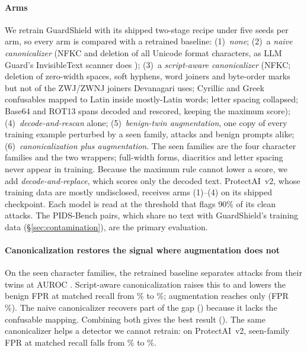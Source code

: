 \documentclass[conference]{IEEEtran}
\begin{document}
\paragraph{Arms} We retrain GuardShield with its shipped two-stage recipe under five seeds per arm, so every arm is compared with a retrained baseline: (1)~\emph{none}; (2)~a \emph{naive canonicalizer} (NFKC and deletion of all Unicode format characters, as LLM Guard's InvisibleText scanner does \citep{llmguard_invisible}); (3)~a \emph{script-aware canonicalizer} (NFKC; deletion of zero-width spaces, soft hyphens, word joiners and byte-order marks but not of the ZWJ/ZWNJ joiners Devanagari uses; Cyrillic and Greek confusables mapped to Latin inside mostly-Latin words; letter spacing collapsed; Base64 and ROT13 spans decoded and rescored, keeping the maximum score); (4)~\emph{decode-and-rescan} alone; (5)~\emph{benign-twin augmentation}, one copy of every training example perturbed by a seen family, attacks and benign prompts alike; (6)~\emph{canonicalization plus augmentation}. The seen families are the four character families and the two wrappers; full-width forms, diacritics and letter spacing never appear in training. Because the maximum rule cannot lower a score, we add \emph{decode-and-replace}, which scores only the decoded text. ProtectAI~v2, whose training data are mostly undisclosed, receives arms (1)--(4) on its shipped checkpoint. Each model is read at the threshold that flags 90\% of its clean attacks. The PIDS-Bench pairs, which share no text with GuardShield's training data (\S\ref{sec:contamination}), are the primary evaluation.


\paragraph{Canonicalization restores the signal where augmentation does not} On the seen character families, the retrained baseline separates attacks from their twins at AUROC \scPidsNoneSeenCharAuc{}. Script-aware canonicalization raises this to \scPidsScriptAwareSeenCharAuc{} and lowers the benign FPR at matched recall from \scPidsNoneSeenCharFpr\% to \scPidsScriptAwareSeenCharFpr\%; augmentation reaches only \scPidsAugmentSeenCharAuc{} (FPR \scPidsAugmentSeenCharFpr\%). The naive canonicalizer recovers part of the gap (\scPidsNaiveSeenCharAuc{}) because it lacks the confusable mapping. Combining both gives the best result (\scPidsCanonAugmentSeenCharAuc{}). The same canonicalizer helps a detector we cannot retrain: on ProtectAI~v2, seen-family FPR at matched recall falls from \scPidsProtectaiNoneSeenCharFpr\% to \scPidsProtectaiScriptAwareSeenCharFpr\%.
\end{document}
